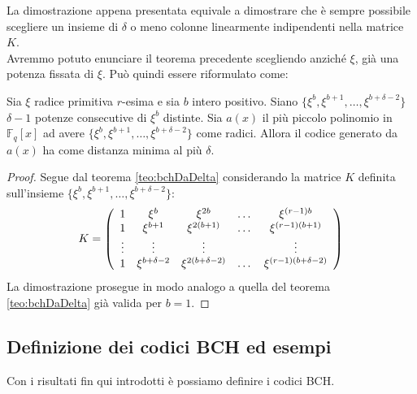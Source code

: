 \noindent
La dimostrazione appena presentata equivale a dimostrare che è sempre possibile scegliere un insieme di $\delta$ o meno colonne linearmente indipendenti nella matrice $K$.
\\
Avremmo potuto enunciare il teorema precedente scegliendo anziché $\xi$, già una potenza fissata di $\xi$. Può quindi essere riformulato come:
\begin{corollario}
   Sia $\xi$ radice primitiva $r$-esima e sia $b$ intero positivo. Siano $\lbrace \xi^{b}, \xi^{b+1}, \dots,\xi^{b + \delta -2} \rbrace $ $\delta -1$ potenze consecutive di $\xi^{b}$ distinte. Sia $a(x)$ il più piccolo polinomio in $\mathbb{F}_{q}[x]$ ad avere  $\lbrace \xi^{b}, \xi^{b+1}, \dots,\xi^{b + \delta -2} \rbrace $ come radici. Allora il codice generato da $a(x)$ ha come distanza minima al più $\delta$.
\end{corollario}
\begin{proof}
   Segue dal teorema \ref{teo:bchDaDelta} considerando la matrice $K$ definita sull'insieme $\lbrace \xi^{b}, \xi^{b+1}, \dots,\xi^{b + \delta -2} \rbrace $:
      \begin{align*}
        K =
 	\left(
 	\begin{array} {c c c c c}
 	1 & \xi^{b} & \xi^{2b} & \dots & \xi^{(r-1)b}   \\
        1 & \xi^{b+1} & \xi^{2(b+1)} & \dots & \xi^{(r-1)(b+1)}   \\
        \vdots & \vdots & \vdots &  & \vdots   \\
        1 & \xi^{b + \delta -  2}& \xi^{2( b+ \delta -  2)} & \dots & \xi^{(r-1)(b + \delta -  2)}
 	\end{array}
 	\right)
     \end{align*}
     La dimostrazione prosegue in modo analogo a quella del teorema \ref{teo:bchDaDelta} già valida per $b=1$.
\end{proof}


\subsection{Definizione dei codici BCH ed esempi}

Con i risultati fin qui introdotti è possiamo definire i codici BCH.

